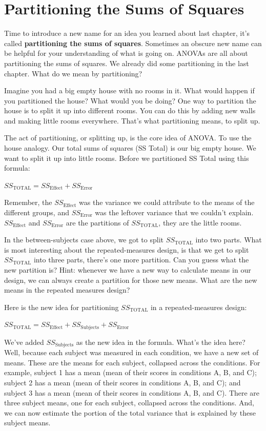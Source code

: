 \documentclass[
  letterpaper,
  DIV=11,
  numbers=noendperiod]{scrreprt}
\begin{document}
\section{Partitioning the Sums of
Squares}\label{partitioning-the-sums-of-squares}

Time to introduce a new name for an idea you learned about last chapter,
it's called \textbf{partitioning the sums of squares}. Sometimes an
obscure new name can be helpful for your understanding of what is going
on. ANOVAs are all about partitioning the sums of squares. We already
did some partitioning in the last chapter. What do we mean by
partitioning?

Imagine you had a big empty house with no rooms in it. What would happen
if you partitioned the house? What would you be doing? One way to
partition the house is to split it up into different rooms. You can do
this by adding new walls and making little rooms everywhere. That's what
partitioning means, to split up.

The act of partitioning, or splitting up, is the core idea of ANOVA. To
use the house analogy. Our total sums of squares (SS Total) is our big
empty house. We want to split it up into little rooms. Before we
partitioned SS Total using this formula:

\(SS_\text{TOTAL} = SS_\text{Effect} + SS_\text{Error}\)

Remember, the \(SS_\text{Effect}\) was the variance we could attribute
to the means of the different groups, and \(SS_\text{Error}\) was the
leftover variance that we couldn't explain. \(SS_\text{Effect}\) and
\(SS_\text{Error}\) are the partitions of \(SS_\text{TOTAL}\), they are
the little rooms.

In the between-subjects case above, we got to split \(SS_\text{TOTAL}\)
into two parts. What is most interesting about the repeated-measures
design, is that we get to split \(SS_\text{TOTAL}\) into three parts,
there's one more partition. Can you guess what the new partition is?
Hint: whenever we have a new way to calculate means in our design, we
can always create a partition for those new means. What are the new
means in the repeated measures design?

Here is the new idea for partitioning \(SS_\text{TOTAL}\) in a
repeated-measures design:

\(SS_\text{TOTAL} = SS_\text{Effect} + SS_\text{Subjects} +SS_\text{Error}\)

We've added \(SS_\text{Subjects}\) as the new idea in the formula.
What's the idea here? Well, because each subject was measured in each
condition, we have a new set of means. These are the means for each
subject, collapsed across the conditions. For example, subject 1 has a
mean (mean of their scores in conditions A, B, and C); subject 2 has a
mean (mean of their scores in conditions A, B, and C); and subject 3 has
a mean (mean of their scores in conditions A, B, and C). There are three
subject means, one for each subject, collapsed across the conditions.
And, we can now estimate the portion of the total variance that is
explained by these subject means.
\end{document}

